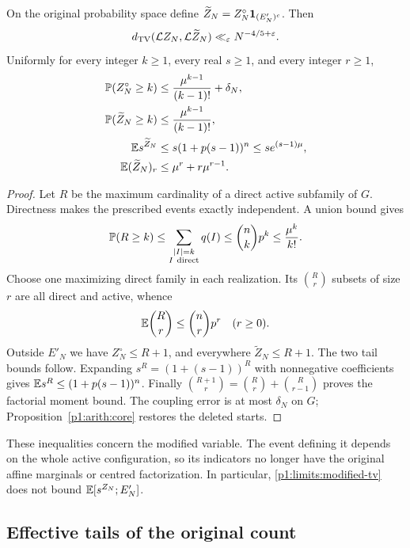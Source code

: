 \begin{theorem}
\label{p1:limits:modified}
On the original probability space define
$\widetilde Z_N=Z_N^\circ\ind_{(E'_N)^c}$.
Then
\begin{equation}
 \TV(\Law Z_N,\Law\widetilde Z_N)
       \ll_\varepsilon N^{-4/5+\varepsilon}.
 \label{p1:limits:modified-tv}
\end{equation}
Uniformly for every integer $k\ge1$, every real $s\ge1$, and
every integer $r\ge1$,
\begin{align}
 \P(Z_N^\circ\ge k)&\le\frac{\mu^{k-1}}{(k-1)!}+\delta_N,
       \label{p1:limits:real-tail}\\
 \P(\widetilde Z_N\ge k)&\le\frac{\mu^{k-1}}{(k-1)!},
       \label{p1:limits:modified-tail}\\
 \E s^{\widetilde Z_N}&\le s(1+p(s-1))^n
                         \le s e^{(s-1)\mu},
       \label{p1:limits:modified-exponential}\\
 \E(\widetilde Z_N)_r&\le\mu^r+r\mu^{r-1}.
       \label{p1:limits:modified-moments}
\end{align}
\end{theorem}
\begin{proof}
Let $R$ be the maximum cardinality of a direct active subfamily of
$G$.  Directness makes the prescribed events exactly independent.
A union bound gives
\[
 \P(R\ge k)\le\sum_{\substack{|I|=k\\I\ \text{direct}}}q(I)
       \le\binom nkp^k\le\frac{\mu^k}{k!}.
\]
Choose one maximizing direct family in each realization.  Its
$\binom Rr$ subsets of size $r$ are all direct and active, whence
\[
 \E\binom Rr\le\binom nrp^r\quad(r\ge0).
\]
Outside $E'_N$ we have $Z_N^\circ\le R+1$, and everywhere
$\widetilde Z_N\le R+1$.  The two tail bounds follow.
Expanding $s^R=(1+(s-1))^R$ with nonnegative coefficients gives
$\E s^R\le(1+p(s-1))^n$.  Finally
$\binom{R+1}{r}=\binom Rr+\binom R{r-1}$ proves the factorial
moment bound.  The coupling error is at most $\delta_N$ on $G$;
Proposition~\ref{p1:arith:core} restores the deleted starts.
\end{proof}

These inequalities concern the modified variable.  The event defining
it depends on the whole active configuration, so its indicators no
longer have the original affine marginals or centred factorization.
In particular, \eqref{p1:limits:modified-tv} does not bound
$\E[s^{Z_N};E'_N]$.

\subsection{Effective tails of the original count}

